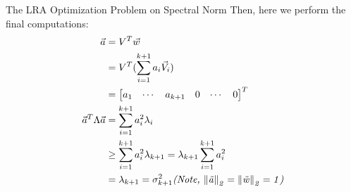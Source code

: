 \begin{ln-explain}{The LRA Optimization Problem on Spectral Norm}{}
    Then, here we perform the final computations:
    \begin{align*}
        \vec{a} &= V^T \vec{w} \\
        &= V^T (\sum_{i = 1}^{k + 1} a_i \vec{V}_i) \\
        &= \begin{bmatrix} a_1 & \cdots & a_{k + 1} & 0 & \cdots & 0 \end{bmatrix}^T \\
        \vec{a}^T \Lambda \vec{a}
        &= \sum_{i = 1}^{k + 1} a_{i}^2 \lambda_i \\
        &\geq \sum_{i = 1}^{k + 1} a_{i}^2 \lambda_{k + 1} = \lambda_{k + 1} \sum_{i = 1}^{k + 1} a_{i}^2 \\
        &= \lambda_{k + 1} = \sigma_{k + 1}^2 \textit{(Note, $\mathit{{\| \vec{a} \|}_{2}^{} = {\| \vec{w} \|}_{2}^{} = 1}$)}
    \end{align*}
\end{ln-explain}

